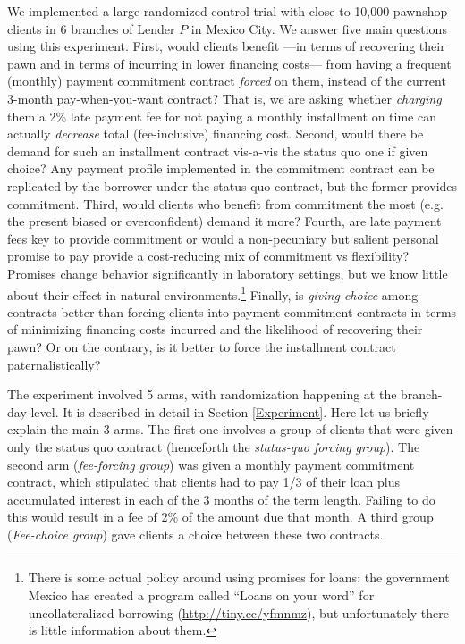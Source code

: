 \documentclass[oneside,11pt]{article}
\begin{document}
We implemented a large randomized control trial with close to 10,000 pawnshop clients in 6 branches of Lender $P$ in Mexico City. We answer five main questions using this experiment. First, would clients benefit  ---in terms of recovering their pawn and in terms of incurring in lower financing costs---  from having a frequent (monthly) payment commitment contract \textit{forced} on them, instead of the current 3-month pay-when-you-want contract? That is, we are asking whether \textit{charging} them a 2\% late payment fee for not paying a monthly installment on time can actually \textit{decrease} total (fee-inclusive) financing cost. Second, would there be demand for such an installment contract vis-a-vis the status quo one if given choice? Any payment profile implemented in the commitment contract can be replicated by the borrower under the status quo contract, but the former provides commitment. Third, would clients who benefit from commitment the most (e.g. the present biased or overconfident) demand it more? Fourth, are late payment fees key to provide commitment or would a non-pecuniary but salient personal promise to pay provide a cost-reducing mix of commitment vs flexibility? Promises change behavior significantly in laboratory settings, but we know little about their effect in natural environments.\footnote{%
There is some actual policy around using promises for loans: the government Mexico has created a program called ``Loans on your word'' for uncollateralized borrowing (\url{http://tiny.cc/yfmnmz}), but unfortunately there is little information about them.} Finally, is \textit{giving choice} among contracts better than forcing clients into payment-commitment contracts in terms of minimizing financing costs incurred and the likelihood of recovering their pawn? Or on the contrary, is it better to force the installment contract 
paternalistically?

The experiment involved 5 arms, with randomization happening at the branch-day level. It is described in detail in Section \ref{Experiment}. Here let us briefly explain the main 3 arms. The first one involves a group of clients that were given only the status quo contract (henceforth the \textit{status-quo forcing group}). The second arm (\textit{fee-forcing group}) was given a monthly payment commitment contract, which stipulated that clients had to pay 1/3 of their loan plus accumulated interest in each of the 3 months of the term length. Failing to do this would result in a fee of 2\% of the amount due that month. A third group (\textit{Fee-choice group}) gave clients a choice between these two contracts. 
\end{document}
